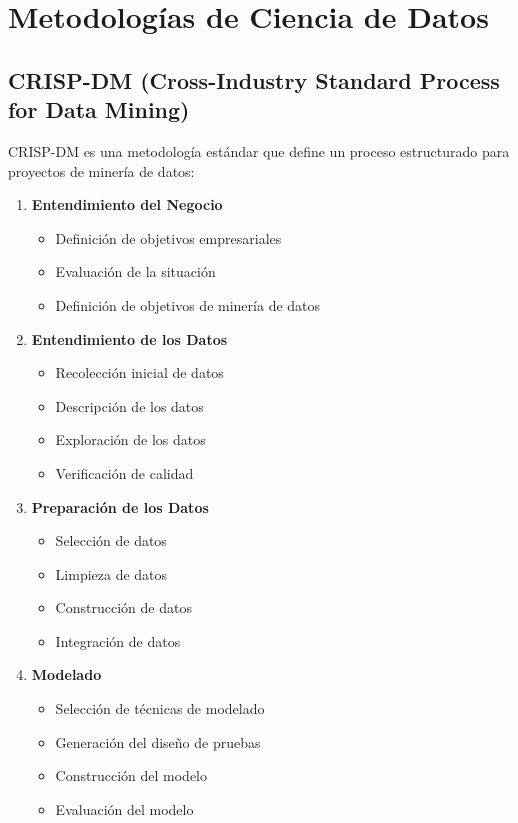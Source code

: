 \section{Metodologías de Ciencia de Datos}

\subsection{CRISP-DM (Cross-Industry Standard Process for Data Mining)}

CRISP-DM es una metodología estándar que define un proceso estructurado para proyectos de minería de datos:

\begin{enumerate}
    \item \textbf{Entendimiento del Negocio}
        \begin{itemize}
            \item Definición de objetivos empresariales
            \item Evaluación de la situación
            \item Definición de objetivos de minería de datos
        \end{itemize}
    
    \item \textbf{Entendimiento de los Datos}
        \begin{itemize}
            \item Recolección inicial de datos
            \item Descripción de los datos
            \item Exploración de los datos
            \item Verificación de calidad
        \end{itemize}
    
    \item \textbf{Preparación de los Datos}
        \begin{itemize}
            \item Selección de datos
            \item Limpieza de datos
            \item Construcción de datos
            \item Integración de datos
        \end{itemize}
    
    \item \textbf{Modelado}
        \begin{itemize}
            \item Selección de técnicas de modelado
            \item Generación del diseño de pruebas
            \item Construcción del modelo
            \item Evaluación del modelo
        \end{itemize}
    

\end{enumerate}
